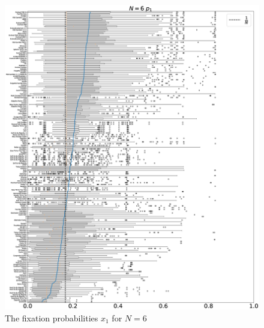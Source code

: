 \documentclass[10pt,letterpaper]{article}
\begin{document}
\begin{figure}[!hbtp]
    \centering
    \includegraphics[draft, width=\textwidth]{./Fig16.eps}
    \caption{The fixation probabilities \(x_1\) for \(N=6\)}
\end{figure}
\end{document}
